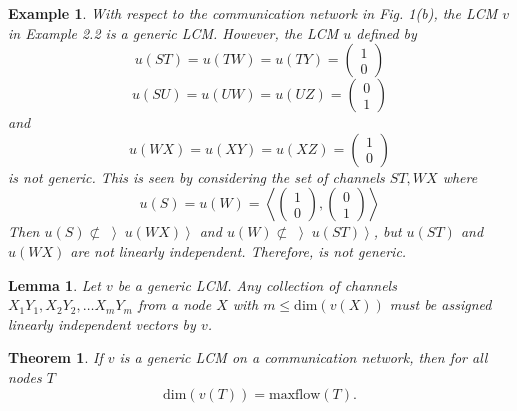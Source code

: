 \documentclass{IEEEtran}
\newtheorem{theo}{Theorem}
\newtheorem{exam}{Example}
\newtheorem{lemm}{Lemma}
\begin{document}
\begin{exam}
	With respect to the communication network in Fig. 1(b), the LCM $v$ in Example 2.2 is a generic LCM. However, the LCM $u$ defined by
	$$ u(ST)=u(TW)=u(TY)=\begin{pmatrix} 1 \\ 0 \end{pmatrix}$$
	$$ u(SU)=u(UW)=u(UZ)=\begin{pmatrix} 0 \\ 1 \end{pmatrix}$$
	and
	$$ u(WX)=u(XY)=u(XZ)=\begin{pmatrix} 1 \\ 0 \end{pmatrix}$$
	is not generic. This is seen by considering the set of channels ${ST,WX}$ where
	$$u(S)=u(W)=\left \langle \begin{pmatrix} 1 \\ 0 \end{pmatrix}, \begin{pmatrix} 0 \\ 1 \end{pmatrix} \right \rangle$$
	Then $u(S)\nsubset \left \rangle u(WX) \right \rangle$ and $u(W)\nsubset \left \rangle u(ST) \right \rangle$, but $u(ST)$ and $u(WX)$ are not linearly independent. Therefore, is not generic.
\end{exam}
\begin{lemm}
	Let $v$ be a generic LCM. Any collection of channels $X_1Y_1, X_2Y_2, \dots X_mY_m$ from a node $X$ with $m \leq \text{dim}(v(X))$ must be assigned linearly independent vectors by $v$.
\end{lemm}
\begin{theo}
	If $v$ is a generic LCM on a communication network, then for all nodes $T$
	$$\text{dim}(v(T))=\text{maxflow}(T).$$
\end{theo}
\end{document}
